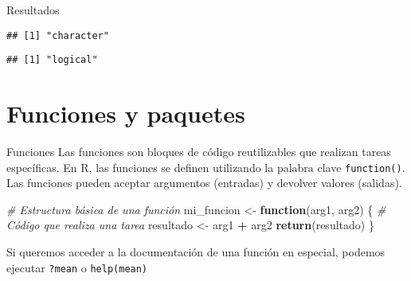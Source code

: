 \documentclass[
  ignorenonframetext,
]{beamer}
\newenvironment{Shaded}{\begin{snugshade}}{\end{snugshade}}
\newcommand{\CommentTok}[1]{\textcolor[rgb]{0.56,0.35,0.01}{\textit{#1}}}
\newcommand{\ControlFlowTok}[1]{\textcolor[rgb]{0.13,0.29,0.53}{\textbf{#1}}}
\newcommand{\FunctionTok}[1]{\textcolor[rgb]{0.13,0.29,0.53}{\textbf{#1}}}
\newcommand{\NormalTok}[1]{#1}
\newcommand{\OtherTok}[1]{\textcolor[rgb]{0.56,0.35,0.01}{#1}}
\newcommand{\SpecialCharTok}[1]{\textcolor[rgb]{0.81,0.36,0.00}{\textbf{#1}}}
\begin{document}
\begin{frame}[fragile]{Resultados}
\label{resultados-3}
\begin{Shaded}
\end{Shaded}

\begin{verbatim}
## [1] "character"
\end{verbatim}

\begin{Shaded}
\end{Shaded}

\begin{verbatim}
## [1] "logical"
\end{verbatim}
\end{frame}

\section{Funciones y paquetes}\label{funciones-y-paquetes}

\begin{frame}[fragile]{Funciones}
\label{funciones}
Las funciones son bloques de código reutilizables que realizan tareas
específicas. En R, las funciones se definen utilizando la palabra clave
\texttt{function()}. Las funciones pueden aceptar argumentos (entradas)
y devolver valores (salidas).

\begin{Shaded}
\begin{Highlighting}[]
\CommentTok{\# Estructura básica de una función}
\NormalTok{mi\_funcion }\OtherTok{\textless{}{-}} \ControlFlowTok{function}\NormalTok{(arg1, arg2) \{}
  \CommentTok{\# Código que realiza una tarea}
\NormalTok{  resultado }\OtherTok{\textless{}{-}}\NormalTok{ arg1 }\SpecialCharTok{+}\NormalTok{ arg2}
  \FunctionTok{return}\NormalTok{(resultado)}
\NormalTok{\}}
\end{Highlighting}
\end{Shaded}

Si queremos acceder a la documentación de una función en especial,
podemos ejecutar \texttt{?mean} o \texttt{help(mean)}
\end{frame}
\end{document}
